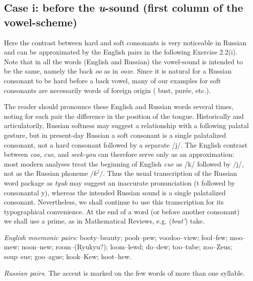 \subsection*{Case i: before the \emph{u}-sound (first column of the vowel-scheme)}

Here the contrast between hard and soft consonants is very noticeable in Russian and can be approximated by the English pairs in the following Exercise 2.2(i). Note that in all the words (English and Russian) the vowel-sound is intended to be the same, namely the back \emph{oo} as in \emph{ooze}. Since it is natural for a Russian consonant to be hard before a back vowel, many of our examples for soft consonants are necessarily words of foreign origin ( bust,  purée, etc.).

The reader should pronounce these English and Russian words several times, noting for each pair the difference in the position of the tongue. Historically and articulatorily, Russian softness may suggest a relationship with a following palatal gesture, but in present-day Russian a soft consonant is a single palatalized consonant, not a hard consonant followed by a separate /j/. The English contrast between \emph{coo}, \emph{cue}, and \emph{seek-you} can therefore serve only as an approximation: most modern analyses treat the beginning of English \emph{cue} as /k/ followed by /j/, not as the Russian phoneme $/k^{j}/$. Thus the usual transcription of the Russian word  package as \emph{tyuk} may suggest an inaccurate pronunciation (t followed by consonantal y), whereas the intended Russian sound is a single palatalized consonant. Nevertheless, we shall continue to use this transcription for its typographical convenience. At the end of a word (or before another consonant) we shall use a prime, as in Mathematical Reviews, e.g.  (\emph{brat'}) take.

\begin{keybox}
\textit{English mnemonic pairs:} booty--beauty; pooh--pew; voodoo--view; fool--few; moo--mew; noon--new; room--(Ryukyu?); loom--lewd; do--dew; too--tube; zoo--Zeus; soup--sue; goo--ague; kook--Kew; hoot--hew.

\medskip
\textit{Russian pairs.} The accent is marked on the few words of more than one syllable.
\end{keybox}

